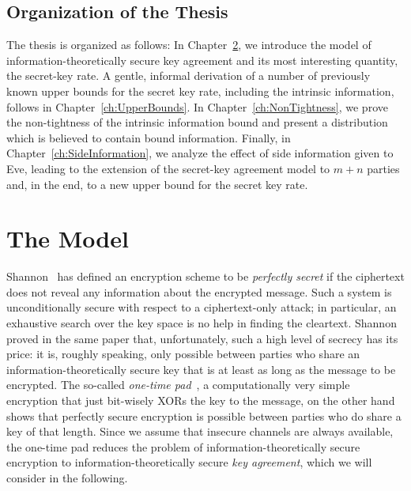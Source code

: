 \documentclass[a4paper, twoside, openany]{report}
\theoremstyle{plain}
\theoremstyle{definition}
\begin{document}

\section{Organization of the Thesis}

The thesis is organized as follows: In Chapter~\ref{ch:Model}, we introduce the model of information-theoretically secure key agreement and its most interesting quantity, the secret-key rate. A gentle, informal derivation of a number of previously known upper bounds for the secret key rate, including the intrinsic information, follows in Chapter~\ref{ch:UpperBounds}. In Chapter~\ref{ch:NonTightness}, we prove the non-tightness of the intrinsic information bound and present a distribution which is believed to contain bound information. Finally, in Chapter~\ref{ch:SideInformation}, we analyze the effect of side information given to Eve, leading to the extension of the secret-key agreement model to $m+n$ parties and, in the end, to a new upper bound for the secret key rate.


\chapter{The Model} \label{ch:Model}

Shannon~\cite{shannon} has defined an encryption scheme to be \emph{perfectly secret} if the ciphertext does not reveal any information about the encrypted message. Such a system is unconditionally secure with respect to a ciphertext-only attack; in particular, an exhaustive search over the key space is no help in finding the cleartext. Shannon proved in the same paper that, unfortunately, such a high level of secrecy has its price: it is, roughly speaking, only possible between parties who share an information-theoretically secure key that is at least as long as the message to be encrypted.
The so-called \emph{one-time pad}~\cite{vernam26}, a computationally very simple encryption that just bit-wisely XORs the key to the message, on the other hand shows that perfectly secure encryption is possible between parties who do share a key of that length. Since we assume that insecure channels are always available, the one-time pad reduces the problem of information-theoretically secure encryption to information-theoretically secure \emph{key agreement}, which we will consider in the following.
\end{document}
